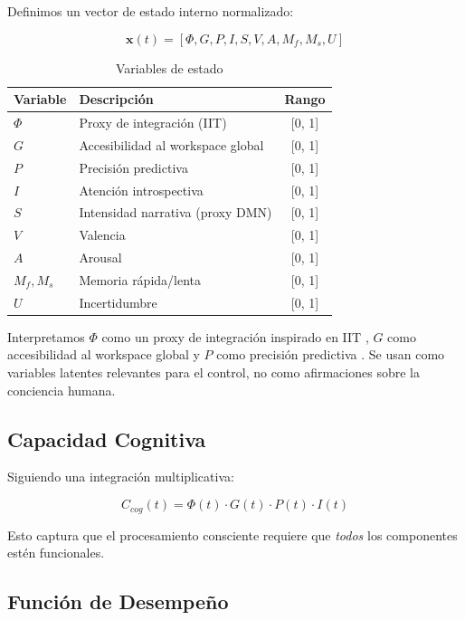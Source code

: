\documentclass{article}
\begin{document}
Definimos un vector de estado interno normalizado:

\begin{equation}
\mathbf{x}(t) = [\Phi, G, P, I, S, V, A, M_f, M_s, U]
\end{equation}

\begin{table}[htbp]
\centering
\caption{Variables de estado}
\label{tab:state_variables}
\begin{tabular}{@{}llc@{}}
\toprule
Variable & Descripción & Rango \\ \midrule
$\Phi$ & Proxy de integración (IIT) & [0, 1] \\
$G$ & Accesibilidad al workspace global & [0, 1] \\
$P$ & Precisión predictiva & [0, 1] \\
$I$ & Atención introspectiva & [0, 1] \\
$S$ & Intensidad narrativa (proxy DMN) & [0, 1] \\
$V$ & Valencia & [0, 1] \\
$A$ & Arousal & [0, 1] \\
$M_f, M_s$ & Memoria rápida/lenta & [0, 1] \\
$U$ & Incertidumbre & [0, 1] \\ \bottomrule
\end{tabular}
\end{table}

Interpretamos $\Phi$ como un proxy de integración inspirado en IIT \cite{Tononi2008}, $G$ como accesibilidad al workspace global \cite{Baars1988} y $P$ como precisión predictiva \cite{Friston2010}. Se usan como variables latentes relevantes para el control, no como afirmaciones sobre la conciencia humana.

\subsection{Capacidad Cognitiva}

Siguiendo una integración multiplicativa:

\begin{equation}
C_{cog}(t) = \Phi(t) \cdot G(t) \cdot P(t) \cdot I(t)
\end{equation}

Esto captura que el procesamiento consciente requiere que \textit{todos} los componentes estén funcionales.

\subsection{Función de Desempeño}
\end{document}
